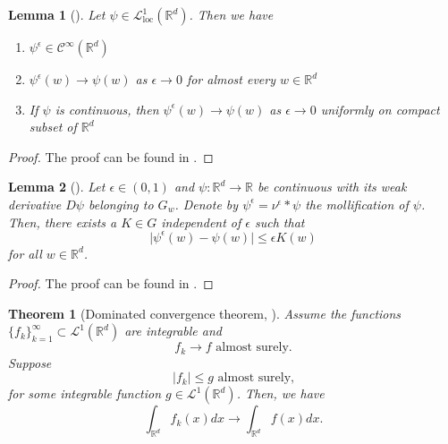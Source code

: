 \documentclass[12pt]{article}
\newtheorem{theorem}{Theorem}[section]
\newtheorem{lemma}[lemma]{Lemma}
\theoremstyle{definition}
\numberwithin{equation}{section}
\newcommand{\R}{\mathbb{R}}
\newcommand{\CL}{\mathcal{L}}
\newcommand{\CC}{\mathcal{C}}
\newcommand{\moll}{\nu^{\epsilon}}
\begin{document}
\begin{lemma}[]
  \label{lemma:mollifiers}
  Let $\psi \in \CL^1_{\text{loc}}(\R^d)$. Then we have
  \begin{enumerate}[label=(\roman*)]
    \item $\psi^{\epsilon} \in \CC^{\infty}(\R^d)$
    \item $\psi^{\epsilon}(w) \rightarrow \psi(w)$ as $\epsilon \rightarrow 0$ for almost every $w \in \R^d$
    \item If $\psi$ is continuous, then $\psi^{\epsilon}(w) \rightarrow \psi(w)$ as $\epsilon \rightarrow 0$ uniformly on compact subset of $\R^d$
  \end{enumerate}
\end{lemma}
\begin{proof}
  The proof can be found in \cite[pp. 630]{evansPartialDifferentialEquations2010}.
\end{proof}
\begin{lemma}[]
  \label{lemma:mollifier_bound}
  Let $\epsilon \in (0,1)$ and $\psi : \R^d \rightarrow \R$ be continuous with its weak derivative $D\psi$ belonging to $G_w$. Denote by $\psi^{\epsilon}  = \moll * \psi$ the mollification of $\psi$. Then, there exists a $K \in G$ independent of $\epsilon$ such that
  \begin{equation*}
    \lvert\psi^{\epsilon}(w) - \psi(w)\rvert \leq \epsilon K(w)
  \end{equation*}
  for all $w \in \R^d$.
\end{lemma}
\begin{proof}
  The proof can be found in 
  \cite{liStochasticModifiedEquations2019}.
\end{proof}
\begin{theorem}[Dominated convergence theorem, ]
  \label{thm:dominated_convergence}
  Assume the functions $\{f_k\}_{k=1}^{\infty} \subset \CL^1(\R^d)$ are integrable and
  \begin{equation*}
    f_k \rightarrow f \text{ almost surely.}
  \end{equation*}
  Suppose
  \begin{equation*}
    |f_k| \leq g \text{ almost surely,}
  \end{equation*}
  for some integrable function $g \in \CL^1(\R^d)$. Then, we have
  \begin{equation*}
    \int_{\R^d} f_k(x) dx \rightarrow \int_{\R^d} f(x) dx.
  \end{equation*}
\end{theorem}
\end{document}
